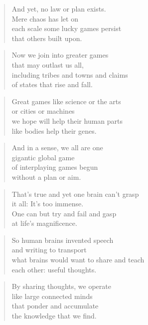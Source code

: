 \documentclass[10pt,a4paper]{article}
\begin{document}
\begin{paracol}{2}
\begin{verse}
And yet, no law or plan exists.\\
Mere chaos has let on\\
each scale some lucky games persist\\
that others built upon.
\end{verse}

\begin{verse}
Now we join into greater games\\
that may outlast us all,\\
including tribes and towns and claims\\
of states that rise and fall.
\end{verse}

\begin{verse}
Great games like science or the arts\\
or cities or machines\\
we hope will help their human parts\\
like bodies help their genes.
\end{verse}

\begin{verse}
And in a sense, we all are one\\
gigantic global game\\
of interplaying games begun\\
without a plan or aim.
\end{verse}

\begin{verse}
That’s true and yet one brain can’t grasp\\
it all: It’s too immense.\\
One can but try and fail and gasp\\
at life’s magnificence.
\end{verse}

\begin{verse}
So human brains invented speech\\
and writing to transport\\
what brains would want to share and teach\\
each other: useful thoughts.
\end{verse}

\begin{verse}
By sharing thoughts, we operate\\
like large connected minds\\
that ponder and accumulate\\
the knowledge that we find.
\end{verse}


\end{paracol}
\end{document}
